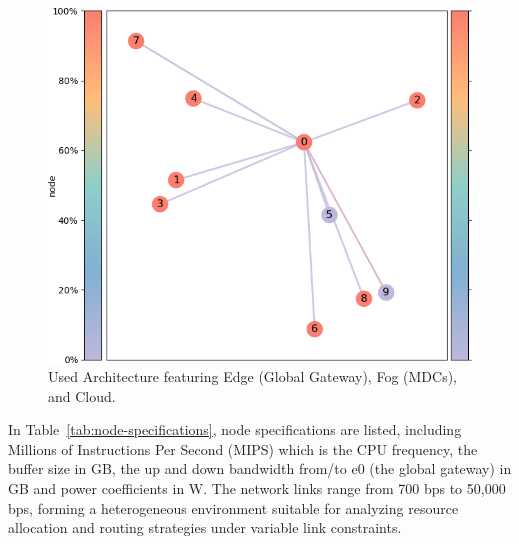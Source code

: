 \documentclass[preprint,3p,authoryear]{elsarticle}
\begin{document}
\begin{figure}[H]
    \centering
    \includegraphics[width=0.75\linewidth]{figs/used_architecture.png}
    \caption{Used Architecture featuring Edge (Global Gateway), Fog (MDCs), and Cloud.}\label{fig:used_architecture}
\end{figure}


In Table~\ref{tab:node-specifications}, node specifications are listed, including Millions of Instructions Per Second (MIPS) which is the CPU frequency, the buffer size in GB, the up and down bandwidth from/to e0 (the global gateway) in GB and power coefficients in W. The network links range from 700 bps to 50,000 bps, forming a heterogeneous environment suitable for analyzing resource allocation and routing strategies under variable link constraints.


\begin{table}[h!]
\centering

\caption{Detailed Specifications of Nodes}\label{tab:node-specifications}
\end{table}
\end{document}
